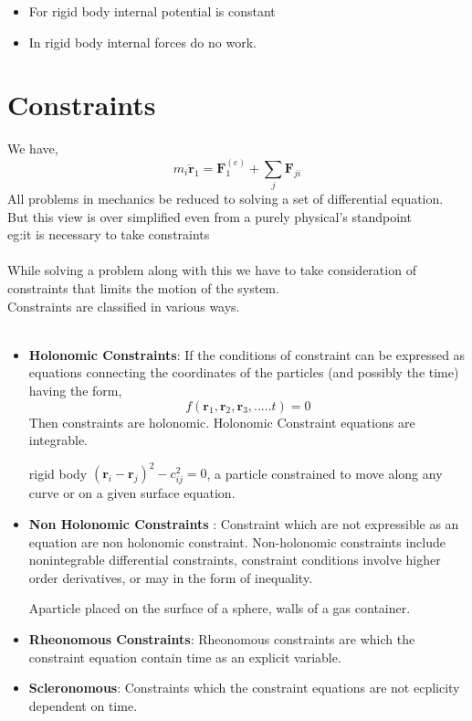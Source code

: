  
\begin{itemize}
	\item For rigid body internal potential is constant
	\item  In rigid body internal forces do no work.
\end{itemize}
\section{Constraints}
We have,
$$ m_i\ddot{\mathbf{r}}_1=\textbf{F}_1^{(e)}+\sum\limits_{j}\textbf{F}_{ji}$$
All problems in mechanics be reduced to solving a set of differential equation. But this view is over simplified even from a purely physical's standpoint \\
eg:it is necessary to take constraints\\\\
While solving a problem along with this we have to take consideration of constraints that limits the motion of the system.\\
Constraints are classified in various ways.\\\\
\begin{itemize}
\item \textbf{Holonomic Constraints}:  If the conditions of constraint can be expressed as equations connecting the coordinates of the particles (and possibly the time) having the form,
	$$ f(\textbf{r}_1,\textbf{r}_2, \textbf{r}_3,.....t)=0$$
	Then constraints are holonomic. Holonomic Constraint equations are integrable.
	\begin{example}
	rigid body $(\textbf{r}_i-\textbf{r}_j)^2-c_{ij}^2=0$,
	a particle constrained to move along any curve or on a given surface equation.
	\end{example}

\item \textbf{Non Holonomic Constraints }:
Constraint which are not expressible as an equation are non holonomic constraint. Non-holonomic constraints include nonintegrable differential constraints, constraint conditions involve higher order derivatives, or may in the form of inequality.\\
\begin{example}
	Aparticle placed on the surface of a sphere, walls of a gas container.
\end{example}
\item \textbf{Rheonomous Constraints}:
Rheonomous constraints are which the constraint equation contain time as an explicit variable.\\
\item \textbf{Scleronomous}: 
Constraints which the constraint equations are not ecplicity dependent on time.\\
\end{itemize}
